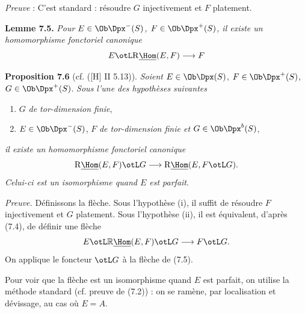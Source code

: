 \emph{Preuve} : C'est standard : résoudre \(G\) injectivement et \(F\) platement.

\textbf{Lemme 7.5.} \emph{Pour \(E\in\Ob\Dpx^-(S)\), \(F\in\Ob\Dpx^+(S)\), il existe un homomorphisme fonctoriel canonique}
\[
  E\otL\mathrm R\underline{\Hom}(E,F)\longrightarrow F
\]

\textbf{Proposition 7.6} (cf. ([H] II 5.13)). \emph{Soient} \(E\in\Ob\Dpx(S)\), \(F\in\Ob\Dpx^+(S)\), \(G\in\Ob\Dpx^+(S)\). \emph{Sous l'une des hypothèses suivantes}
\begin{enumerate}[label=\roman*)]
\item \(G\) \emph{de tor-dimension finie},
\item \(E\in\Ob\Dpx^-(S)\), \(F\) \emph{de tor-dimension finie et} \(G\in\Ob\Dpx^b(S)\),
\end{enumerate}
\emph{il existe un homomorphisme fonctoriel canonique}
\[
  \mathrm R\underline{\Hom}(E,F)\otL G
  \longrightarrow
  \mathrm R\underline{\Hom}(E,F\otL G).
\]
\emph{Celui-ci est un isomorphisme quand \(E\) est parfait}.

\emph{Preuve.} Définissons la flèche. Sous l'hypothèse (i), il suffit de résoudre \(F\) injectivement et \(G\) platement. Sous l'hypothèse (ii), il est équivalent, d'après (7.4), de définir une flèche
\[
  E\otL\mathbb{R}\underline{\Hom}(E,F)\otL G\longrightarrow F\otL G.
\]
On applique le foncteur \(\otL G\) à la flèche de (7.5).

Pour voir que la flèche est un isomorphisme quand \(E\) est parfait, on utilise la méthode standard (cf. preuve de (7.2)) : on se ramène, par localisation et dévissage, au cas où \(E=A\).

